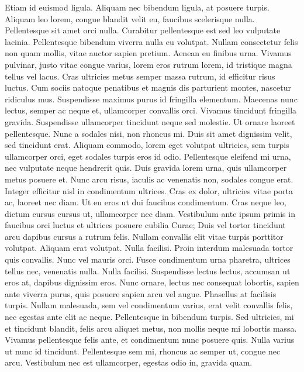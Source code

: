 \documentclass{article}
\begin{document}
{{ Etiam id euismod ligula.
 Aliquam nec bibendum ligula, at posuere turpis.
 Aliquam leo lorem, congue blandit velit eu, faucibus scelerisque nulla.
 Pellentesque sit amet orci nulla.
 Curabitur pellentesque est sed leo vulputate lacinia.
 Pellentesque bibendum viverra nulla eu volutpat.
 Nullam consectetur felis non quam mollis, vitae auctor sapien pretium.
 Aenean eu finibus urna.
 Vivamus pulvinar, justo vitae congue varius, lorem eros rutrum lorem, id tristique magna tellus vel lacus.
 Cras ultricies metus semper massa rutrum, id efficitur risus luctus.
 Cum sociis natoque penatibus et magnis dis parturient montes, nascetur ridiculus mus.
 Suspendisse maximus purus id fringilla elementum.
 Maecenas nunc lectus, semper ac neque et, ullamcorper convallis orci.
 Vivamus tincidunt fringilla gravida.
 Suspendisse ullamcorper tincidunt neque sed molestie.
 Ut ornare laoreet pellentesque.
 Nunc a sodales nisi, non rhoncus mi.
 Duis sit amet dignissim velit, sed tincidunt erat.
 Aliquam commodo, lorem eget volutpat ultricies, sem turpis ullamcorper orci, eget sodales turpis eros id odio.
 Pellentesque eleifend mi urna, nec vulputate neque hendrerit quis.
 Duis gravida lorem urna, quis ullamcorper metus posuere et.
 Nunc arcu risus, iaculis ac venenatis non, sodales congue erat.
 Integer efficitur nisl in condimentum ultrices.
 Cras ex dolor, ultricies vitae porta ac, laoreet nec diam.
 Ut eu eros ut dui faucibus condimentum.
 Cras neque leo, dictum cursus cursus ut, ullamcorper nec diam.
 Vestibulum ante ipsum primis in faucibus orci luctus et ultrices posuere cubilia Curae; Duis vel tortor tincidunt arcu dapibus cursus a rutrum felis.
 Nullam convallis elit vitae turpis porttitor volutpat.
 Aliquam erat volutpat.
 Nulla facilisi.
 Proin interdum malesuada tortor quis convallis.
 Nunc vel mauris orci.
 Fusce condimentum urna pharetra, ultrices tellus nec, venenatis nulla.
 Nulla facilisi.
 Suspendisse lectus lectus, accumsan ut eros at, dapibus dignissim eros.
 Nunc ornare, lectus nec consequat lobortis, sapien ante viverra purus, quis posuere sapien arcu vel augue.
 Phasellus at facilisis turpis.
 Nullam malesuada, sem vel condimentum varius, erat velit convallis felis, nec egestas ante elit ac neque.
 Pellentesque in bibendum turpis.
 Sed ultricies, mi et tincidunt blandit, felis arcu aliquet metus, non mollis neque mi lobortis massa.
 Vivamus pellentesque felis ante, et condimentum nunc posuere quis.
 Nulla varius ut nunc id tincidunt.
 Pellentesque sem mi, rhoncus ac semper ut, congue nec arcu.
 Vestibulum nec est ullamcorper, egestas odio in, gravida quam.
}}
\end{document}
